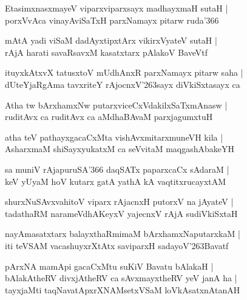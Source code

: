 \begin{shloka}
EtasimxnasxmayeV viparxviparxsayx madhayxmaH sutaH |\\
porxVvAca vinayAviSaTxH parxNamayx pitarw ruda\char'366
\end{shloka}

\begin{shloka}
mAtA yadi viSaM dadAyxtipxtArx vikirxVyateV sutaH |\\
rAjA harati savaRsavxM kasatxtarx pAlakoV BaveVtf
\end{shloka}

\begin{shloka}
ituyxkAtxvX tatusxtoV mUdhAnxR parxNamayx pitarw saha |\\
dUteYjaRgAma tavxriteY rAjocnxV\char'263sayx diVkiSxtasayx ca
\end{shloka}

\begin{shloka}
Atha tw bArxhamxNw putarxviceCxVdakilxSaTxmAnasw |\\
ruditAvx ca ruditAvx ca aMdhaBAvaM parxjagumxtuH
\end{shloka}

\begin{shloka}
atha teV pathayxgacaCxMta vishAvxmitarxmuneVH kila |\\
AsharxmaM shiSayxyukatxM ca seVvitaM maqgashAbakeYH 
\end{shloka}

\begin{shloka}
sa muniV rAjapuruSA\char'366 daqSATx paparxcaCx sAdaraM |\\
keV yUyaM hoV kutarx gatA yathA kA vaqtitxrucayxtAM 
\end{shloka}

\begin{shloka}
shurxNuSAvxvahitoV viparx rAjacnxH putorxV na jAyateV |\\
tadathaRM narameVdhAKeyxV yajecnxV rAjA sudiVkiSxtaH
\end{shloka}

\begin{shloka}
nayAmasatxtarx balayxthaRmimaM bArxhamxNaputarxkaM |\\
iti teVSAM vacashuyxrXtAtx saviparxH sadayoV\char'263Bavatf
\end{shloka}

\begin{shloka}
pArxNA mamApi gacaCxMtu suKiV Bavatu bAlakaH |\\
bAlakAtheRV divxjAtheRV ca sAvxmayxtheRV yeV janA ha |\\
tayxjaMti taqNavatApxrXNAMsetxVSaM loVkAsatxnAtanAH 
\end{shloka}

